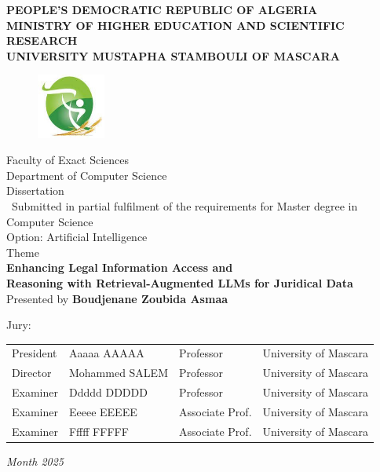 \thispagestyle{empty}
\begin{center}
	\begin{title}
		\textbf{\uppercase{ People's Democratic Republic of Algeria }} \\[0.2cm]
		\textbf{\uppercase{ MINISTRY OF HIGHER EDUCATION AND SCIENTIFIC RESEARCH }} \\[0.5cm]
		\textbf{\uppercase{ UNIVERSITY MUSTAPHA STAMBOULI OF MASCARA}}
	\end{title}
	\begin{figure}[H]
		\centering
		\label{logo_UD}\includegraphics[width=0.2\textwidth]{Figures/Logo_UM.jpg}
	\end{figure}
	{\large Faculty of Exact Sciences} \\[0.2cm]
	{\large Department of Computer Science} \\[0.2cm]
	{\large Dissertation } \\[0.2cm]
	{\ Submitted in partial fulfilment of the requirements for Master degree in Computer Science} \\[0.2cm]
	{\large Option: Artificial Intelligence}\\[0.5cm]
	
    {\large Theme} \\[0.3cm]
	{\LARGE {\textbf{Enhancing Legal Information Access and \\ Reasoning  with  Retrieval-Augmented LLMs for Juridical Data}}}
	\\[0.7cm]

	{\large Presented by \textbf{Boudjenane Zoubida Asmaa} }\\[0.5cm]

\end{center}
Jury:\\
\begin{tabular}{llll}
	President    &  Aaaaa AAAAA & Professor & University of Mascara\\
	Director     &  Mohammed SALEM & Professor & University of Mascara\\
	Examiner     &  Ddddd DDDDD & Professor	& University of Mascara\\
	Examiner	 &  Eeeee EEEEE & Associate Prof.  & University of Mascara\\
	Examiner	 &  Fffff FFFFF & Associate Prof.  & University of Mascara\\
\end{tabular}
\vfill
\begin{center}
	
	\it{Month  2025}
\end{center}